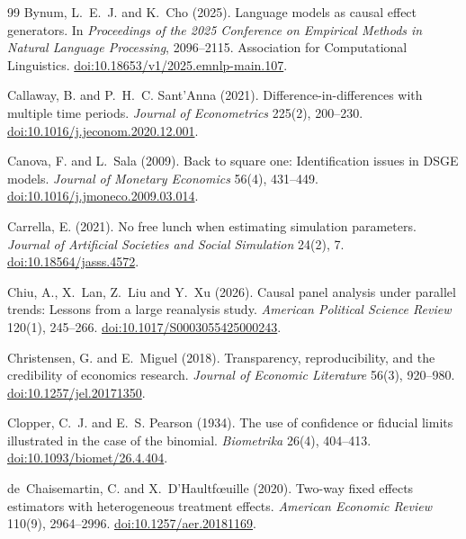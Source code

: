 \documentclass[11pt]{article}
\begin{document}
\begin{thebibliography}{99}
Bynum, L.~E.~J. and K.~Cho (2025).
Language models as causal effect generators.
In \emph{Proceedings of the 2025 Conference on Empirical Methods in Natural Language
Processing}, 2096--2115. Association for Computational Linguistics.
\href{https://doi.org/10.18653/v1/2025.emnlp-main.107}{doi:10.18653/v1/2025.emnlp-main.107}.

Callaway, B. and P.~H.~C. Sant'Anna (2021).
Difference-in-differences with multiple time periods.
\emph{Journal of Econometrics} 225(2), 200--230.
\href{https://doi.org/10.1016/j.jeconom.2020.12.001}{doi:10.1016/j.jeconom.2020.12.001}.

Canova, F. and L.~Sala (2009).
Back to square one: Identification issues in {DSGE} models.
\emph{Journal of Monetary Economics} 56(4), 431--449.
\href{https://doi.org/10.1016/j.jmoneco.2009.03.014}{doi:10.1016/j.jmoneco.2009.03.014}.

Carrella, E. (2021).
No free lunch when estimating simulation parameters.
\emph{Journal of Artificial Societies and Social Simulation} 24(2), 7.
\href{https://doi.org/10.18564/jasss.4572}{doi:10.18564/jasss.4572}.

Chiu, A., X.~Lan, Z.~Liu and Y.~Xu (2026).
Causal panel analysis under parallel trends: Lessons from a large reanalysis study.
\emph{American Political Science Review} 120(1), 245--266.
\href{https://doi.org/10.1017/S0003055425000243}{doi:10.1017/S0003055425000243}.

Christensen, G. and E.~Miguel (2018).
Transparency, reproducibility, and the credibility of economics research.
\emph{Journal of Economic Literature} 56(3), 920--980.
\href{https://doi.org/10.1257/jel.20171350}{doi:10.1257/jel.20171350}.

Clopper, C.~J. and E.~S. Pearson (1934).
The use of confidence or fiducial limits illustrated in the case of the binomial.
\emph{Biometrika} 26(4), 404--413.
\href{https://doi.org/10.1093/biomet/26.4.404}{doi:10.1093/biomet/26.4.404}.

de~Chaisemartin, C. and X.~D'Haultf{\oe}uille (2020).
Two-way fixed effects estimators with heterogeneous treatment effects.
\emph{American Economic Review} 110(9), 2964--2996.
\href{https://doi.org/10.1257/aer.20181169}{doi:10.1257/aer.20181169}.


\end{thebibliography}
\end{document}
